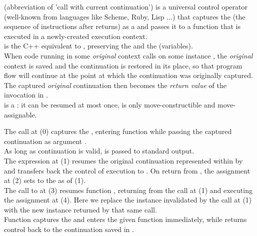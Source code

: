 \newpage
{}

\cc (abbreviation of 'call with current continuation') is a universal control
operator (well-known from languages like Scheme, Ruby, Lisp ...) that captures
the \currcont (the sequence of instructions after \cc returns) as a
 and passes it to a function that is
executed in a newly-created execution context.\\

\callcc is the C++ equivalent to \cc, preserving the  and the
 (variables).\\

When code running in some \emph{original} context calls \resume on some \cont
instance , the \emph{original} context is saved and
the  continuation is restored in its place, so that program flow
will continue at the point at which the  continuation was
originally captured. The captured \emph{original} continuation then becomes
the \emph{return value} of the \callcc invocation in .\\

\cont is a : it can be resumed at most once, is only
move-constructible and move-assignable.

The  call at (0) captures the \currcont, entering function
 while passing the captured continuation as argument .\\

As long as continuation  is valid,  is passed to standard
output.\\

The expression  at (1) resumes the original
continuation represented within  by  and transfers back the
control of execution to . On return from ,
the assignment at (2) sets  to the \currcont as of (1).\\

The call to  at (3)
resumes function , returning from the \resume call at (1) and executing
the assignment at (4). Here we replace the \cont instance 
invalidated by the \resume call at (1) with the new instance returned by that
same \resume call.\\

Function \callcc captures the \currcont and enters the given function immediately,
while \resume returns control back to the continuation saved in .\\

